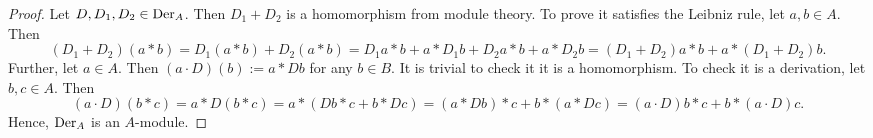 \begin{proof}
  Let $D, D_1, D_2 \in {\rm Der}_A$.
  Then $D_1 + D_2$ is a homomorphism from module theory.
  To prove it satisfies the Leibniz rule, let $a, b \in A$.
  Then
  \begin{equation}
    (D_1 + D_2)(a * b)
    = D_1(a * b) + D_2(a * b)
    = D_1 a * b + a * D_1 b + D_2 a * b + a * D_2 b
    = (D_1 + D_2) a * b + a * (D_1 + D_2) b.
  \end{equation}
  Further, let $a \in A$.
  Then $(a \cdot D)(b) := a * D b$ for any $b \in B$.
  It is trivial to check it it is a homomorphism.
  To check it is a derivation, let $b, c \in A$.
  Then
  \begin{equation}
    (a \cdot D)(b * c)
    = a * D(b * c)
    = a * (D b * c + b * D c)
    = (a * D b) * c + b * (a * D c)
    = (a \cdot D) b * c + b * (a \cdot D) c. 
  \end{equation}
  Hence, ${\rm Der}_A$ is an $A$-module.
\end{proof}
